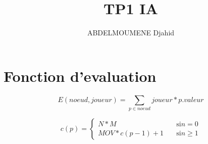 \documentclass {article}
\title{TP1 IA}
\author{ABDELMOUMENE Djahid}
\begin{document}
\maketitle

\section{Fonction d'evaluation}
\begin{equation}
   E(noeud, joueur) = \sum_{p \in noeud} joueur * p.valeur
\end{equation}

\begin{equation}
   c(p) =
   \begin{cases}
      N * M            &  \quad \text{si} n = 0 \\
      MOV * c(p-1) + 1 &  \quad \text{si} n \geq 1
   \end{cases}
\end{equation}
\end{document}
